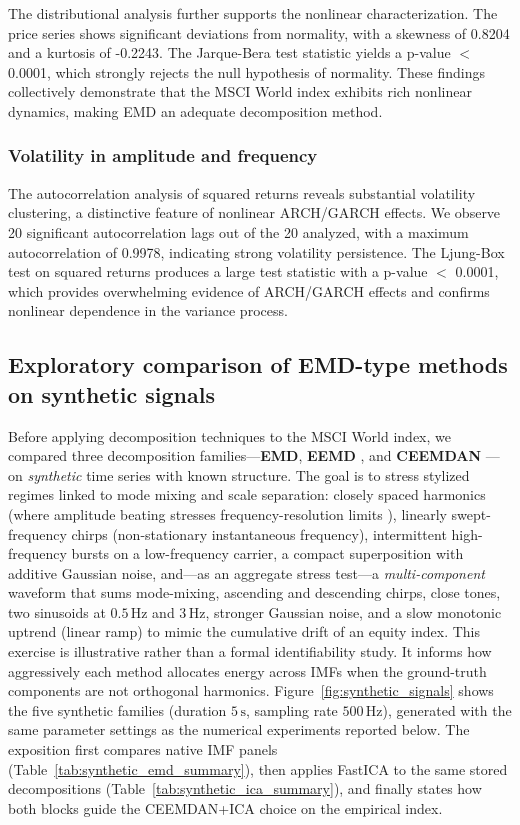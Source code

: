 \documentclass[11pt,a4paper]{article}
\begin{document}
The distributional analysis further supports the nonlinear characterization. The price series shows significant deviations from normality, with a skewness of 0.8204 and a kurtosis of -0.2243. The Jarque-Bera test statistic yields a p-value $<$ 0.0001, which strongly rejects the null hypothesis of normality. These findings collectively demonstrate that the MSCI World index exhibits rich nonlinear dynamics, making EMD an adequate decomposition method.

\subsubsection{Volatility in amplitude and frequency}

The autocorrelation analysis of squared returns reveals substantial volatility clustering, a distinctive feature of nonlinear ARCH/GARCH effects. We observe 20 significant autocorrelation lags out of the 20 analyzed, with a maximum autocorrelation of 0.9978, indicating strong volatility persistence. The Ljung-Box test on squared returns produces a large test statistic with a p-value $<$ 0.0001, which provides overwhelming evidence of ARCH/GARCH effects and confirms nonlinear dependence in the variance process.

\subsection{Exploratory comparison of EMD-type methods on synthetic signals}
\label{sec:synthetic_emd}

Before applying decomposition techniques to the MSCI World index, we compared three decomposition families---\textbf{EMD}, \textbf{EEMD} \citep{wu2009ensemble}, and \textbf{CEEMDAN} \citep{torres2011complete}---on \emph{synthetic} time series with known structure. The goal is to stress stylized regimes linked to mode mixing and scale separation: closely spaced harmonics (where amplitude beating stresses frequency-resolution limits \citep{rilling2008one}), linearly swept-frequency chirps (non-stationary instantaneous frequency), intermittent high-frequency bursts on a low-frequency carrier, a compact superposition with additive Gaussian noise, and---as an aggregate stress test---a \emph{multi-component} waveform that sums mode-mixing, ascending and descending chirps, close tones, two sinusoids at $0.5\,\mathrm{Hz}$ and $3\,\mathrm{Hz}$, stronger Gaussian noise, and a slow monotonic uptrend (linear ramp) to mimic the cumulative drift of an equity index. This exercise is illustrative rather than a formal identifiability study. It informs how aggressively each method allocates energy across IMFs when the ground-truth components are not orthogonal harmonics. Figure~\ref{fig:synthetic_signals} shows the five synthetic families (duration $5\,\mathrm{s}$, sampling rate $500\,\mathrm{Hz}$), generated with the same parameter settings as the numerical experiments reported below. The exposition first compares native IMF panels (Table~\ref{tab:synthetic_emd_summary}), then applies FastICA to the same stored decompositions (Table~\ref{tab:synthetic_ica_summary}), and finally states how both blocks guide the CEEMDAN+ICA choice on the empirical index.
\end{document}

